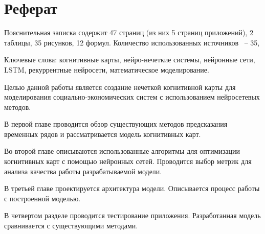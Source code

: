 \chapter*{Реферат}
\thispagestyle{plain}

Пояснительная записка содержит 47 страниц (из них 5 страниц приложений),
2 таблицы, 35 рисунков, 12 формул. Количество использованных источников ~-- 35,

Ключевые слова: когнитивные карты, нейро-нечеткие системы,
нейронные сети, LSTM, рекуррентные нейросети, математическое моделирование.

Целью данной работы является создание нечеткой когнитивной карты для моделирования
социально-экономических систем с использованием нейросетевых методов.

В первой главе проводится обзор существующих методов предсказания временных рядов
и рассматривается модель когнитивных карт.

Во второй главе описываются использованные алгоритмы для оптимизации
когнитивных карт с помощью нейронных сетей.
Проводится выбор метрик для анализа качества работы разрабатываемой модели.

В третьей главе проектируется архитектура модели.
Описывается процесс работы с построенной моделью.

В четвертом разделе проводится тестирование приложения.
Разработанная модель сравнивается с существующими методами.
